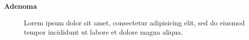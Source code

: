 \begin{description}
    \item[\textbf{Adenoma}] Lorem ipsum dolor sit amet, consectetur adipisicing elit, sed do eiusmod tempor incididunt ut labore et dolore magna aliqua.
\end{description}
